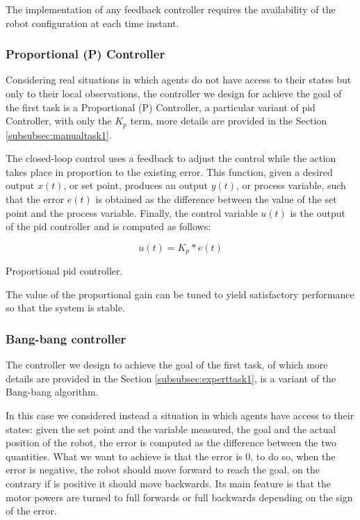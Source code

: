 The implementation of any feedback controller requires the availability of the 
robot configuration at each time instant. 

\subsubsection{Proportional (P) Controller}
\label{subsubsec:pid}

Considering real situations in which agents do not have access to their states but 
only to their local observations, the controller we design for achieve the goal of 
the first task is a Proportional (P) Controller,  a particular variant of \gls{pid} 
Controller, with only the $K_p$ term, more details are provided in the Section 
\ref{subsubsec:manualtask1}.

The closed-loop control uses a feedback to adjust the control while the action 
takes place in proportion to the existing error. This function, given a desired 
output $x(t)$, or set point, produces an output $y(t)$, or process variable, such 
that the error $e(t)$ is obtained as the difference between the value of the set 
point and the process variable. Finally, the control variable $u(t)$ is the output of 
the \gls{pid} controller and is computed as follows:
\begin{Equation}[!h]
	\centering
	\begin{equation}
	u(t) = K_p * e(t)
	\end{equation}
	\caption[Proportioal PID controller.]{Proportional \gls{pid} controller.}
	\label{eq:pid}
\end{Equation}

The value of the proportional gain can be tuned to yield satisfactory 
performance so that the system is stable.

\subsubsection{Bang-bang controller}
\label{subsubsec:bangbang}
The controller we design to achieve the goal of the first task, of which more 
details are provided in the Section \ref{subsubsec:experttask1}, is a variant of the 
Bang-bang algorithm.

In this case we considered instead a situation in which agents have access to their 
states: given the set point and the variable measured, the goal and the actual 
position of the robot, the error is computed as the difference between the two 
quantities.
What we want to achieve is that the error is 0, to do so, when the error is negative, 
the robot should move forward to reach the goal, on the contrary if is positive it 
should move backwards. Its main feature is that the motor powers are turned to 
full forwards or full backwards depending on the sign of the error. 

